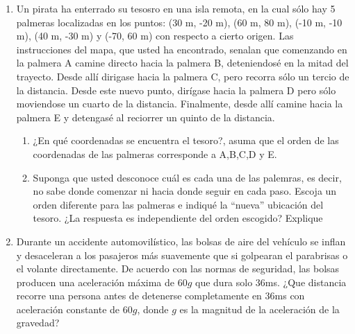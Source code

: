 \documentclass[letterpaper,10pt,onecolumn]{article}
\begin{document}
\begin{enumerate}
\item Un pirata ha enterrado su tesosro en una isla remota, en la cual sólo hay 5 palmeras localizadas en los puntos: (30 m, -20 m), (60 m, 80 m), (-10 m, -10 m), (40 m, -30 m) y (-70, 60 m) con respecto a cierto origen. Las instrucciones del mapa, que usted ha encontrado, senalan que comenzando en la palmera A camine directo hacia la palmera B, deteniendosé en la mitad del trayecto. Desde allí dirigase hacia la palmera C, pero recorra sólo un tercio de la distancia. Desde este nuevo punto, dirígase hacia la palmera D pero sólo moviendose un cuarto de la distancia. Finalmente, desde allí camine hacia la palmera E y detengasé al reciorrer un quinto de la distancia. 
\begin{enumerate}
\item ¿En qué coordenadas se encuentra el tesoro?, asuma que el orden de las coordenadas de las palmeras corresponde a A,B,C,D y E.
\item Suponga que usted desconoce cuál es cada una de las palemras, es decir, no sabe donde comenzar ni hacia donde seguir  en cada paso. Escoja un orden diferente para las palmeras e indiqué la ``nueva'' ubicación del tesoro. ¿La respuesta es independiente del orden escogido? Explique
\end{enumerate}  %

\item
Durante un accidente automovilístico, las bolsas de aire del vehículo se inflan y desaceleran a los pasajeros más suavemente que si golpearan el parabrisas o el volante directamente. De acuerdo con las normas de seguridad, las bolsas producen una aceleración máxima de $60g$ que dura solo $36$ms. ¿Que distancia recorre una persona antes de detenerse completamente en $36$ms con aceleración constante de $60 g$, donde $g$ es la magnitud de la aceleraci\'on de la gravedad?  

\end{enumerate}
\end{document}
